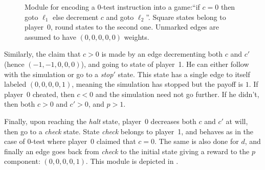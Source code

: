 \begin{figure}
\centering
{}
\caption[Module for encoding a $0$-test instruction into a game.]{Module for encoding a $0$-test instruction into a game:``if $c=0$ then goto $\ell_1$ else decrement $c$ and goto $\ell_2$''. Square states belong to player~0, round states to the second one. Unmarked edges are assumed to have $(0,0,0,0,0)$ weights.}
\label{tj:fig:zerotest}
\end{figure}

Similarly, the claim that $c>0$ is made by an edge decrementing both $c$ and $c'$ (hence $(-1,-1,0,0,0)$), and going to state of player~1.
He can either follow with the simulation or go to a \emph{stop$'$} state.
This state has a single edge to itself labeled $(0,0,0,0,1)$, meaning the simulation has stopped but the payoff is $1$.
If player~0 cheated, then $c<0$ and the simulation need not go further.
If he didn't, then both $c>0$ and $c'>0$, and $p>1$.

Finally, upon reaching the \emph{halt} state, player~0 decreases both $c$ and $c'$ at will, then go to a \emph{check} state.
State \emph{check} belongs to player~1, and behaves as in the case of $0$-test where player~0 claimed that $c=0$.
The same is also done for $d$, and finally an edge goes back from \emph{check} to the initial state giving a reward to the $p$ component: $(0,0,0,0,1)$.
This module is depicted in .


